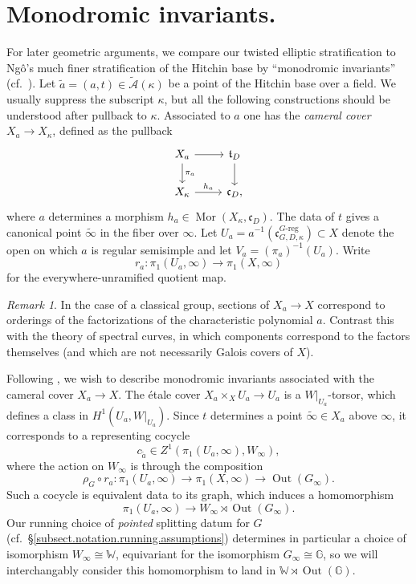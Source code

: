 \documentclass[openany]{amsbook}
\theoremstyle{definition}
\theoremstyle{remark}
\newtheorem{remark}[theorem]{Remark}
\numberwithin{equation}{section}
\newcommand{\G}{\mathbb{G}}
\newcommand{\W}{\mathbb{W}}
\newcommand{\cA}{\mathcal{A}}
\renewcommand{\-}{\operatorname{-}}
\newcommand{\Mor}{\operatorname{Mor}}
\newcommand{\Out}{\operatorname{Out}}
\newcommand{\wtilde}[1]{\widetilde{#1}}
\newcommand{\ctA}{\widetilde{\cA}}
\newcommand{\ft}{\mathfrak{t}}
\newcommand{\fc}{\mathfrak{c}}
\newcommand{\Greg}{G\text{-reg}}
\begin{document}
\section{\texorpdfstring{Monodromic invariants.}{Monodromic invariants.}}\label{subsect.Ngo.monod.comp}
For later geometric arguments, we compare our twisted elliptic stratification to Ng\^o's much finer stratification of the Hitchin base by ``monodromic invariants'' (cf.\ \cite[\S 5.6]{ngofl}). Let $\wtilde{a} = (a,t) \in \ctA(\kappa)$ be a point of the Hitchin base over a field. We usually suppress the subscript $\kappa$, but all the following constructions should be understood after pullback to $\kappa$. Associated to $a$ one has the \textit{cameral cover} $X_a \to X_{\kappa}$, defined as the pullback
\begin{equation} \label{eqn.spec.curve.I}
    \begin{tikzcd}[ampersand replacement=\&]
        X_a \ar[r] \ar[d, "\pi_a"] \& \ft_D \ar[d] \\
        X_{\kappa} \ar[r, "h_a"] \& \fc_D,
    \end{tikzcd}
\end{equation}
where $a$ determines a morphism $h_a \in \Mor(X_{\kappa}, \fc_D)$. The data of $t$ gives a canonical point $\wtilde{\infty}$ in the fiber over $\infty$. 
Let $U_a = a^{-1}(\fc_{G,D,\kappa}^{\Greg}) \subset X$ denote the open on which $a$ is regular semisimple and let $V_a =(\pi_a)^{-1}(U_a)$. Write
$$
    r_a : \pi_1(U_a, \infty) \to \pi_1(X, \infty)
$$
for the everywhere-unramified quotient map.

\begin{remark} In the case of a classical group, sections of $X_a \to X$ correspond to orderings of the factorizations of the characteristic polynomial $a$. Contrast this with the theory of spectral curves, in which components correspond to the factors themselves (and which are not necessarily Galois covers of $X$). 
\end{remark}

Following \cite[\S 5.6]{ngofl}, we wish to describe monodromic invariants associated with the cameral cover $X_a \to X$. The \'etale cover $X_a \times_X U_a \to U_a$ is a $W|_{U_a}$-torsor, which defines a class in $H^1(U_a, W|_{U_a})$. Since $t$ determines a point $\wtilde{\infty} \in X_a$ above $\infty$, it corresponds to a representing cocycle
$$
    c_{\wtilde{a}} \in Z^1(\pi_1(U_a, \infty), W_{\infty}),
$$
where the action on $W_\infty$ is through the composition 
$$
    \rho_G \circ r_a : \pi_1(U_a, \infty) \to \pi_1(X, \infty) \to \Out(G_\infty).
$$
Such a cocycle is equivalent data to its graph, which induces a homomorphism
$$
    \pi_1(U_a, \infty) \to W_{\infty} \rtimes \Out(G_\infty).
$$
Our running choice of \textit{pointed} splitting datum for $G$ (cf.\ \S \ref{subsect.notation.running.assumptions}) determines in particular a choice of isomorphism $W_\infty \cong \W$, equivariant for the isomorphism $G_\infty \cong \G$, so we will interchangably consider this homomorphism to land in $\W \rtimes \Out(\G)$.
\end{document}
